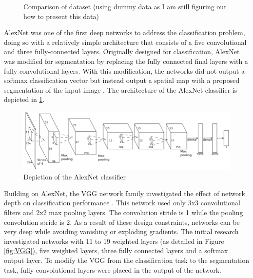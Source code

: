 \documentclass[letterpaper, 10 pt, conference]{ieeeconf}  %
\begin{document}
\begin{figure}
\caption{Comparison of dataset (using dummy data as I am still figuring out how to present this data)}
\end{figure}

AlexNet was one of the first deep networks to address the classification problem, doing so with a relatively simple architecture that consists of a five convolutional and three fully-connected layers. Originally designed for classification, AlexNet was modified for segmentation by replacing the fully connected final layers with a fully convolutional layers. With this modification, the networks did not output a softmax classification vector but instead output a spatial map with a proposed segmentation of the input image \cite{garcia_article} \cite{krizhevsky_imagenet_2012}. The architecture of the AlexNet classifier is depicted in \ref{fig:alexnet}.

\begin{figure}
  \includegraphics[width=\linewidth]{images/alexnet1.png}
  \caption{Depiction of the AlexNet classifier}
   \label{fig:alexnet}
\end{figure}

Building on AlexNet, the VGG network family investigated the effect of network depth on classification performance \cite{simonyan_VGG}. This network used only 3x3 convolutional filters and 2x2 max pooling layers. The convolution stride is 1 while the pooling convolution stride is 2. As a result of these design constraints, networks can be very deep while avoiding vanishing or exploding gradients. The initial research investigated networks with 11 to 19 weighted layers (as detailed in Figure \ref{fig:VGG}), five weighted layers, three fully connected layers and a softmax output layer. To modify the VGG from the classification task to the segmentation task, fully convolutional layers were placed in the output of the network. 
\end{document}
